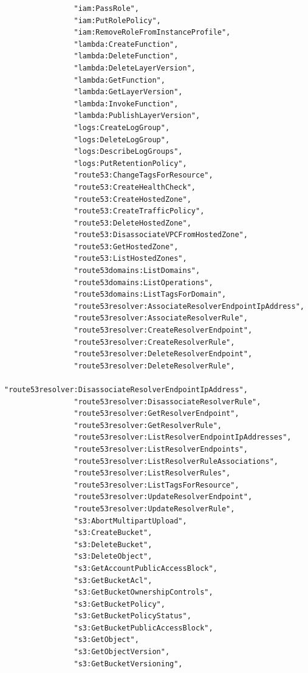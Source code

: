 \begin{verbatim}
                "iam:PassRole",
                "iam:PutRolePolicy",
                "iam:RemoveRoleFromInstanceProfile",
                "lambda:CreateFunction",
                "lambda:DeleteFunction",
                "lambda:DeleteLayerVersion",
                "lambda:GetFunction",
                "lambda:GetLayerVersion",
                "lambda:InvokeFunction",
                "lambda:PublishLayerVersion",
                "logs:CreateLogGroup",
                "logs:DeleteLogGroup",
                "logs:DescribeLogGroups",
                "logs:PutRetentionPolicy",
                "route53:ChangeTagsForResource",
                "route53:CreateHealthCheck",
                "route53:CreateHostedZone",
                "route53:CreateTrafficPolicy",
                "route53:DeleteHostedZone",
                "route53:DisassociateVPCFromHostedZone",
                "route53:GetHostedZone",
                "route53:ListHostedZones",
                "route53domains:ListDomains",
                "route53domains:ListOperations",
                "route53domains:ListTagsForDomain",
                "route53resolver:AssociateResolverEndpointIpAddress",
                "route53resolver:AssociateResolverRule",
                "route53resolver:CreateResolverEndpoint",
                "route53resolver:CreateResolverRule",
                "route53resolver:DeleteResolverEndpoint",
                "route53resolver:DeleteResolverRule",
                "route53resolver:DisassociateResolverEndpointIpAddress",
                "route53resolver:DisassociateResolverRule",
                "route53resolver:GetResolverEndpoint",
                "route53resolver:GetResolverRule",
                "route53resolver:ListResolverEndpointIpAddresses",
                "route53resolver:ListResolverEndpoints",
                "route53resolver:ListResolverRuleAssociations",
                "route53resolver:ListResolverRules",
                "route53resolver:ListTagsForResource",
                "route53resolver:UpdateResolverEndpoint",
                "route53resolver:UpdateResolverRule",
                "s3:AbortMultipartUpload",
                "s3:CreateBucket",
                "s3:DeleteBucket",
                "s3:DeleteObject",
                "s3:GetAccountPublicAccessBlock",
                "s3:GetBucketAcl",
                "s3:GetBucketOwnershipControls",
                "s3:GetBucketPolicy",
                "s3:GetBucketPolicyStatus",
                "s3:GetBucketPublicAccessBlock",
                "s3:GetObject",
                "s3:GetObjectVersion",
                "s3:GetBucketVersioning",

\end{verbatim}
